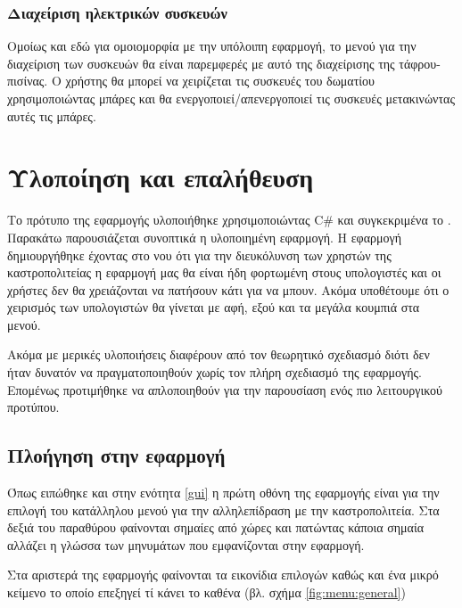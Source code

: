 \documentclass{assignment}
\begin{document}
\subsubsection{Διαχείριση ηλεκτρικών συσκευών}

Ομοίως και εδώ για ομοιομορφία με την υπόλοιπη εφαρμογή, το μενού για την διαχείριση των συσκευών θα είναι παρεμφερές με αυτό της διαχείρισης της τάφρου-πισίνας. Ο χρήστης θα μπορεί να χειρίζεται τις συσκευές του δωματίου χρησιμοποιώντας μπάρες και θα ενεργοποιεί/απενεργοποιεί τις συσκευές μετακινώντας αυτές τις μπάρες.

\section{Υλοποίηση και επαλήθευση}

Το πρότυπο της εφαρμογής υλοποιήθηκε χρησιμοποιώντας C\# και συγκεκριμένα το . Παρακάτω παρουσιάζεται συνοπτικά η υλοποιημένη εφαρμογή. Η εφαρμογή δημιουργήθηκε έχοντας στο νου ότι για την διευκόλυνση των χρηστών της καστροπολιτείας η εφαρμογή μας θα είναι ήδη φορτωμένη στους υπολογιστές και οι χρήστες δεν θα χρειάζονται να πατήσουν κάτι για να μπουν. Ακόμα υποθέτουμε ότι ο χειρισμός των υπολογιστών θα γίνεται με αφή, εξού και τα μεγάλα κουμπιά στα μενού.

Ακόμα με μερικές υλοποιήσεις διαφέρουν από τον θεωρητικό σχεδιασμό διότι δεν ήταν δυνατόν να πραγματοποιηθούν χωρίς τον πλήρη σχεδιασμό της εφαρμογής. Επομένως προτιμήθηκε να απλοποιηθούν για την παρουσίαση ενός πιο λειτουργικού προτύπου.

\subsection{Πλοήγηση στην εφαρμογή}

Όπως ειπώθηκε και στην ενότητα \ref{gui} η πρώτη οθόνη της εφαρμογής είναι για την επιλογή του κατάλληλου μενού για την αλληλεπίδραση με την καστροπολιτεία. Στα δεξιά του παραθύρου φαίνονται σημαίες από χώρες και πατώντας κάποια σημαία αλλάζει η γλώσσα των μηνυμάτων που εμφανίζονται στην εφαρμογή.

Στα αριστερά της εφαρμογής φαίνονται τα εικονίδια επιλογών καθώς και ένα μικρό κείμενο το οποίο επεξηγεί τί κάνει το καθένα (βλ. σχήμα \ref{fig:menu:general})
\end{document}
